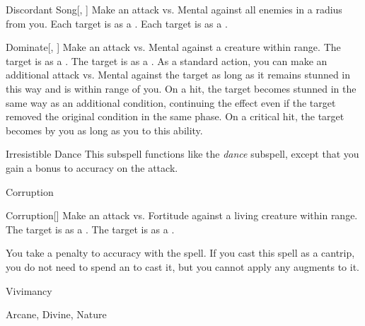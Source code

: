 \begin{ability}[\nth{4}]{Discordant Song}[, ]
Make an attack vs. Mental against all enemies in a \areamed radius from you.
\hit Each target is \disoriented as a .
\crit Each target is \confused as a .
\end{ability}
\vspace{0.25em}


\begin{ability}[\nth{4}]{Dominate}[, ]
Make an attack vs. Mental against a creature within \rngmed range.
\hit The target is  as a .
\crit The target is  as a .
As a standard action, you can make an additional attack vs. Mental against the target as long as it remains stunned in this way and is within \rngmed range of you.
On a hit, the target becomes stunned in the same way as an additional condition, continuing the effect even if the target removed the original condition in the same phase.
On a critical hit, the target becomes  by you as long as you  to this ability.
\end{ability}
\vspace{0.25em}


\begin{ability}[\nth{6}]{Irresistible Dance}
This subspell functions like the \textit{dance} subspell, except that you gain a  bonus to accuracy on the attack.
\end{ability}
\vspace{0.25em}

\newpage
\begin{spellsection}{Corruption}

\begin{spellheader}
\end{spellheader}


\begin{ability}{Corruption}[]
Make an attack vs. Fortitude against a living creature within \rngclose range.
\hit The target is  as a .
\crit The target is  as a .
\end{ability}



You take a  penalty to accuracy with the spell.
If you cast this spell as a cantrip,
you do not need to spend an  to cast it,
but you cannot apply any augments to it.


 Vivimancy

 Arcane, Divine, Nature
\end{spellsection}


